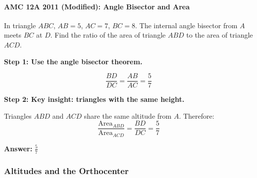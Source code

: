 ﻿\documentclass[12pt]{extarticle}
\begin{document}
\paragraph{AMC 12A 2011 (Modified): Angle Bisector and Area}

In triangle $ABC$, $AB = 5$, $AC = 7$, $BC = 8$. The internal angle bisector from $A$ meets $BC$ at $D$. Find the ratio of the area of triangle $ABD$ to the area of triangle $ACD$.

\begin{solutionbox}
\textbf{Step 1: Use the angle bisector theorem.}

\[\frac{BD}{DC} = \frac{AB}{AC} = \frac{5}{7}\]

\textbf{Step 2: Key insight: triangles with the same height.}

Triangles $ABD$ and $ACD$ share the same altitude from $A$. Therefore:
\[\frac{\text{Area}_{ABD}}{\text{Area}_{ACD}} = \frac{BD}{DC} = \frac{5}{7}\]

\textbf{Answer:} $\boxed{\frac{5}{7}}$
\end{solutionbox}

\subsubsection{Altitudes and the Orthocenter}
\end{document}
